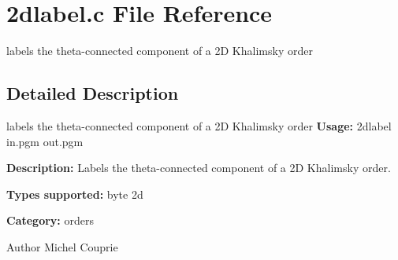 \section{2dlabel.c File Reference}
\label{2dlabel_8c}


labels the theta-\/connected component of a 2D Khalimsky order  




\subsection{Detailed Description}
labels the theta-\/connected component of a 2D Khalimsky order {\bfseries Usage:} 2dlabel in.pgm out.pgm

{\bfseries Description:} Labels the theta-\/connected component of a 2D Khalimsky order.

{\bfseries Types supported:} byte 2d

{\bfseries Category:} orders

\begin{DoxyAuthor}{Author}
Michel Couprie 
\end{DoxyAuthor}
